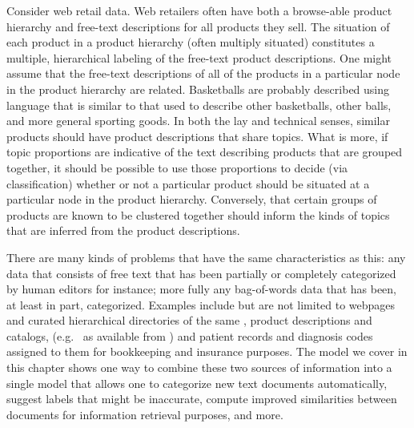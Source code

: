 Consider web
retail data. Web retailers often have both a browse-able product hierarchy and
free-text descriptions for all products they sell. The situation of each
product in a product hierarchy (often multiply situated) constitutes a
multiple, hierarchical labeling of the free-text product descriptions.  One might assume that the free-text descriptions of all of the products in a particular node in the product hierarchy are related.  Basketballs are probably described using language that is similar to that used to describe other basketballs, other balls, and more general sporting goods.   In both the lay and technical senses, similar products should have product descriptions that share topics.   What is more, if topic proportions are indicative of the text describing products that are grouped together, it should be possible to use those proportions to decide (via classification) whether or not a particular product should be situated at a particular node in the product hierarchy.  Conversely, that certain groups of products are known to be clustered together should inform the kinds of topics that are inferred from the product descriptions.




There are many kinds of problems that have the same characteristics as this: any data  that consists of free text that has been partially or
completely categorized by human editors for instance; more fully
any bag-of-words data that has been, at least in part, 
categorized. 
 Examples include but are not limited to webpages and curated
hierarchical directories of the same \cite{DMOZ}, product descriptions and
catalogs, (e.g.~\cite{AMAZON} as available from \cite{SNAP})
and patient records %
and diagnosis codes assigned to them for bookkeeping and insurance purposes.
The model we cover in this chapter shows one way to combine 
these two sources of information into a single model that allows one to
categorize new text documents automatically, suggest labels that might be
inaccurate, compute improved similarities between documents for information
retrieval purposes, and more. %

